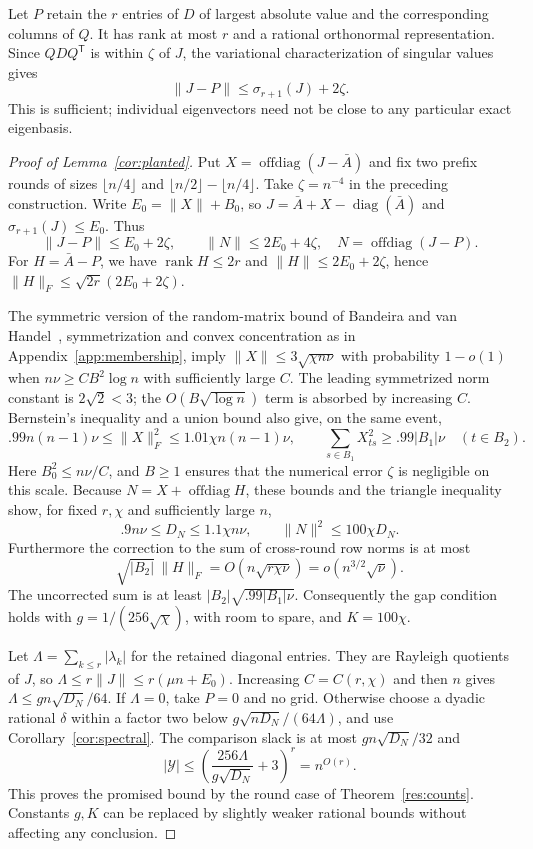 \documentclass[11pt,a4paper]{article}
\theoremstyle{definition}
\theoremstyle{remark}
\DeclareMathOperator{\rank}{rank}
\begin{document}
Let $P$ retain the $r$ entries of $D$ of largest absolute value and the
corresponding columns of $Q$. It has rank at most $r$ and a rational
orthonormal representation. Since $QDQ^{\mathsf T}$ is within $\zeta$
of $J$, the variational characterization of singular values gives
\begin{equation}
 \|J-P\|\le\sigma_{r+1}(J)+2\zeta.\label{eq:spectral-tail}
\end{equation}
This is sufficient; individual eigenvectors need not be close to any
particular exact eigenbasis.

\begin{proof}[Proof of Lemma~\ref{cor:planted}]
Put $X=\operatorname{offdiag}(J-\bar A)$ and fix two prefix rounds of
sizes $\lfloor n/4\rfloor$ and $\lfloor n/2\rfloor-\lfloor n/4\rfloor$.
Take $\zeta=n^{-4}$ in the preceding construction. Write
$E_0=\|X\|+B_0$, so $J=\bar A+X-\operatorname{diag}(\bar A)$ and
$\sigma_{r+1}(J)\le E_0$. Thus
\[
 \|J-P\|\le E_0+2\zeta,\qquad
 \|N\|\le2E_0+4\zeta,
 \quad N=\operatorname{offdiag}(J-P).
\]
For $H=\bar A-P$, we have $\rank H\le2r$ and
$\|H\|\le2E_0+2\zeta$, hence
$\|H\|_F\le\sqrt{2r}(2E_0+2\zeta)$.

The symmetric version of the random-matrix bound of
Bandeira and van Handel~\cite{BvH16}, symmetrization and convex
concentration as in Appendix~\ref{app:membership}, imply
$\|X\|\le3\sqrt{\chi n\nu}$ with probability $1-o(1)$ when
$n\nu\ge CB^2\log n$ with sufficiently large $C$.
The leading symmetrized norm constant is $2\sqrt2<3$; the
$O(B\sqrt{\log n})$ term is absorbed by increasing $C$.
Bernstein's inequality and a union bound also give, on the same event,
\[
 .99n(n-1)\nu\le\|X\|_F^2\le1.01\chi n(n-1)\nu,
 \qquad
 \sum_{s\in B_1}X_{ts}^2\ge.99|B_1|\nu\quad(t\in B_2).
\]
Here $B_0^2\le n\nu/C$, and $B\ge1$ ensures that the numerical error
$\zeta$ is negligible on this scale. Because
$N=X+\operatorname{offdiag}H$, these bounds and the triangle inequality
show, for fixed $r,\chi$ and sufficiently large $n$,
\[
 .9n\nu\le D_N\le1.1\chi n\nu,\qquad \|N\|^2\le100\chi D_N.
\]
Furthermore the correction to the sum of cross-round row norms is at most
\[
 \sqrt{|B_2|}\,\|H\|_F=O(n\sqrt{r\chi\nu})
      =o(n^{3/2}\sqrt\nu).
\]
The uncorrected sum is at least
$|B_2|\sqrt{.99|B_1|\nu}$. Consequently the gap condition holds with
$g=1/(256\sqrt\chi)$, with room to spare, and $K=100\chi$.

Let $\Lambda=\sum_{k\le r}|\lambda_k|$ for the retained diagonal entries.
They are Rayleigh quotients of $J$, so
$\Lambda\le r\|J\|\le r(\mu n+E_0)$.
Increasing $C=C(r,\chi)$ and then $n$ gives
$\Lambda\le gn\sqrt{D_N}/64$.
If $\Lambda=0$, take $P=0$ and no grid. Otherwise choose a dyadic rational
$\delta$ within a factor two below
$g\sqrt{nD_N}/(64\Lambda)$, and use Corollary~\ref{cor:spectral}.
The comparison slack is at most $gn\sqrt{D_N}/32$ and
\[
 |\mathcal Y|\le
 \left(\frac{256\Lambda}{g\sqrt{D_N}}+3\right)^r=n^{O(r)}.
\]
This proves the promised bound by the round case of
Theorem~\ref{res:counts}. Constants $g,K$ can be replaced by slightly
weaker rational bounds without affecting any conclusion.


\end{proof}
\end{document}
